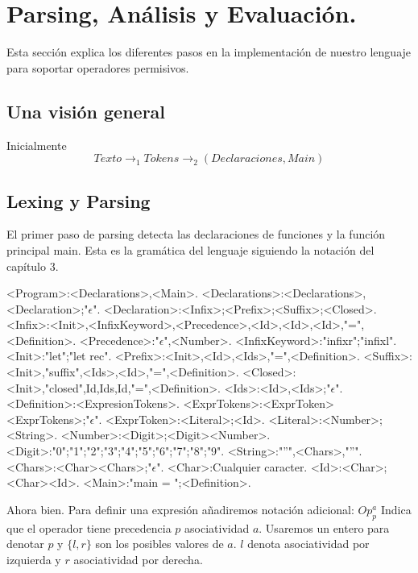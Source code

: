 \chapter{Parsing, Análisis y Evaluación.}

Esta sección explica los diferentes pasos en la implementación de nuestro lenguaje para 
soportar operadores permisivos. 
\section{Una visión general}
Inicialmente
$$Texto \rightarrow_{1} Tokens \rightarrow_{2} (Declaraciones,Main) $$

\section{Lexing y Parsing}
El primer paso de parsing detecta las declaraciones de funciones y la función
principal main. 
Esta es la gramática del lenguaje siguiendo la notación del capítulo 3. 

\begin{grammar}
  <Program>:<Declarations>,<Main>.
  <Declarations>:<Declarations>,<Declaration>;"$\epsilon$".
  <Declaration>:<Infix>;<Prefix>;<Suffix>;<Closed>.
  <Infix>:<Init>,<InfixKeyword>,<Precedence>,<Id>,<Id>,<Id>,"=",<Definition>.
  <Precedence>:"$\epsilon$",<Number>.
  <InfixKeyword>:"infixr";"infixl".
  <Init>:"let";"let rec".
  <Prefix>:<Init>,<Id>,<Ids>,"=",<Definition>.
  <Suffix>:<Init>,"suffix",<Ids>,<Id>,"=",<Definition>.
  <Closed>:<Init>,"closed",Id,Ids,Id,"=",<Definition>.
  <Ids>:<Id>,<Ids>;"$\epsilon$".
  <Definition>:<ExpresionTokens>.
  <ExprTokens>:<ExprToken><ExprTokens>;"$\epsilon$".
  <ExprToken>:<Literal>;<Id>.
  <Literal>:<Number>;<String>.
  <Number>:<Digit>;<Digit><Number>.
  <Digit>:"0";"1";"2";"3";"4";"5";"6";"7";"8";"9".
  <String>:"''",<Chars>,"''".
  <Chars>:<Char><Chars>;"$\epsilon$".
  <Char>:Cualquier caracter.
  <Id>:<Char>;<Char><Id>.
  <Main>:"main = ";<Definition>.
  \end{grammar}

Ahora bien. Para definir una expresión añadiremos notación adicional:
$Op_{p}^{a}$ Indica que el operador tiene precedencia $p$ asociatividad $a$. 
Usaremos un entero para denotar $p$ y $\{l,r\}$ son los posibles valores de $a$.
$l$ denota asociatividad por izquierda y $r$ asociatividad por derecha.  

